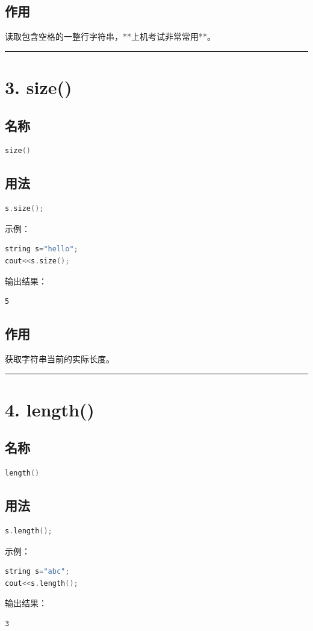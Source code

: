 \documentclass[10pt,twocolumn]{extarticle}
\begin{document}
\subsection{作用}
读取包含空格的一整行字符串，**上机考试非常常用**。

\noindent\rule{\linewidth}{0.4pt}

\section{3. size()}

\subsection{名称}
\begin{lstlisting}[language=C++]
size()
\end{lstlisting}

\subsection{用法}
\begin{lstlisting}[language=C++]
s.size();
\end{lstlisting}
示例：
\begin{lstlisting}[language=C++]
string s="hello";
cout<<s.size();
\end{lstlisting}
输出结果：
\begin{lstlisting}
5
\end{lstlisting}

\subsection{作用}
获取字符串当前的实际长度。

\noindent\rule{\linewidth}{0.4pt}

\section{4. length()}

\subsection{名称}
\begin{lstlisting}[language=C++]
length()
\end{lstlisting}

\subsection{用法}
\begin{lstlisting}[language=C++]
s.length();
\end{lstlisting}
示例：
\begin{lstlisting}[language=C++]
string s="abc";
cout<<s.length();
\end{lstlisting}
输出结果：
\begin{lstlisting}
3
\end{lstlisting}
\end{document}
